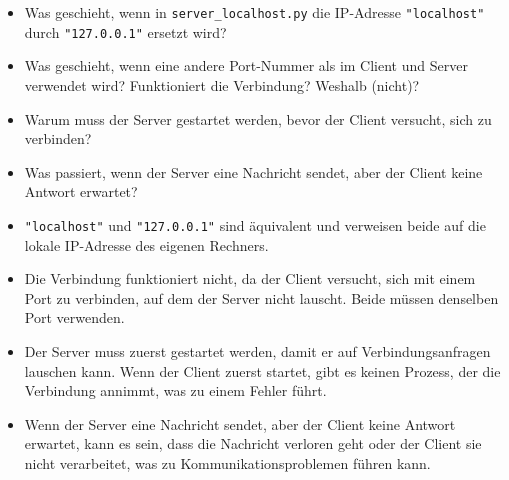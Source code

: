 \begin{myexercise}[Verständnisfragen]
    \begin{itemize}
        \item Was geschieht, wenn in \texttt{server\_localhost.py} die IP-Adresse \lstinline|"localhost"| durch \lstinline|"127.0.0.1"| ersetzt wird?
        \item Was geschieht, wenn eine andere Port-Nummer als im Client und Server verwendet wird? Funktioniert die Verbindung? Weshalb (nicht)?
        \item Warum muss der Server gestartet werden, bevor der Client versucht, sich zu verbinden?
        \item Was passiert, wenn der Server eine Nachricht sendet, aber der Client keine Antwort erwartet?
    \end{itemize}
    \begin{myanswer}
        \begin{itemize}
            \item \lstinline|"localhost"| und \lstinline|"127.0.0.1"| sind äquivalent und verweisen beide auf die lokale IP-Adresse des eigenen Rechners.
            \item Die Verbindung funktioniert nicht, da der Client versucht, sich mit einem Port zu verbinden, auf dem der Server nicht lauscht. Beide müssen denselben Port verwenden.
            \item Der Server muss zuerst gestartet werden, damit er auf Verbindungsanfragen lauschen kann. Wenn der Client zuerst startet, gibt es keinen Prozess, der die Verbindung annimmt, was zu einem Fehler führt.
            \item Wenn der Server eine Nachricht sendet, aber der Client keine Antwort erwartet, kann es sein, dass die Nachricht verloren geht oder der Client sie nicht verarbeitet, was zu Kommunikationsproblemen führen kann.
        \end{itemize}
    \end{myanswer}
\end{myexercise}



